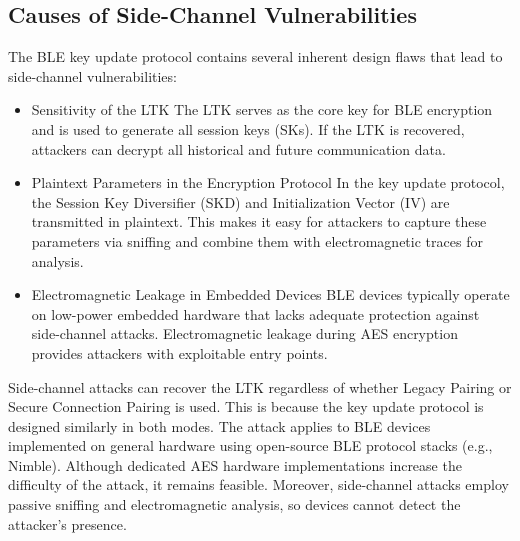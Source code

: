 \documentclass{article}
\begin{document}
\subsection{Causes of Side-Channel Vulnerabilities}
The BLE key update protocol contains several inherent design flaws that lead to side-channel vulnerabilities:
\begin{itemize}
    \item Sensitivity of the LTK 
        The LTK serves as the core key for BLE encryption and is used to generate all session keys (SKs). If the LTK is recovered, attackers can decrypt all historical and future communication data.
    \item Plaintext Parameters in the Encryption Protocol
        In the key update protocol, the Session Key Diversifier (SKD) and Initialization Vector (IV) are transmitted in plaintext. This makes it easy for attackers to capture these parameters via sniffing and combine them with electromagnetic traces for analysis.
    \item Electromagnetic Leakage in Embedded Devices 
        BLE devices typically operate on low-power embedded hardware that lacks adequate protection against side-channel attacks. Electromagnetic leakage during AES encryption provides attackers with exploitable entry points.
\end{itemize}
Side-channel attacks can recover the LTK regardless of whether Legacy Pairing or Secure Connection Pairing is used. This is because the key update protocol is designed similarly in both modes. The attack applies to BLE devices implemented on general hardware using open-source BLE protocol stacks (e.g., Nimble). Although dedicated AES hardware implementations increase the difficulty of the attack, it remains feasible. Moreover, side-channel attacks employ passive sniffing and electromagnetic analysis, so devices cannot detect the attacker’s presence.
\end{document}
